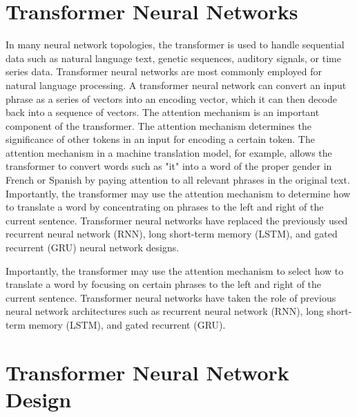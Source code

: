 \section{Transformer Neural Networks}
In many neural network topologies, the transformer is used to handle sequential data such as natural language text, genetic sequences, auditory signals, or time series data. Transformer neural networks are most commonly employed for natural language processing. A transformer neural network can convert an input phrase as a series of vectors into an encoding vector, which it can then decode back into a sequence of vectors. The attention mechanism is an important component of the transformer. The attention mechanism determines the significance of other tokens in an input for encoding a certain token. The attention mechanism in a machine translation model, for example, allows the transformer to convert words such as "it" into a word of the proper gender in French or Spanish by paying attention to all relevant phrases in the original text. Importantly, the transformer may use the attention mechanism to determine how to translate a word by concentrating on phrases to the left and right of the current sentence. Transformer neural networks have replaced the previously used recurrent neural network (RNN), long short-term memory (LSTM), and gated recurrent (GRU) neural network designs.

Importantly, the transformer may use the attention mechanism to select how to translate a word by focusing on certain phrases to the left and right of the current sentence. Transformer neural networks have taken the role of previous neural network architectures such as recurrent neural network (RNN), long short-term memory (LSTM), and gated recurrent (GRU).

\section {Transformer Neural Network Design}

